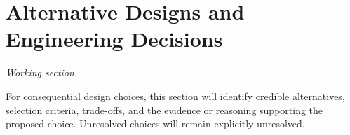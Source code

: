 \section{Alternative Designs and Engineering Decisions}
\label{sec:alternatives}

\textit{Working section.}

For consequential design choices, this section will identify credible alternatives,
selection criteria, trade-offs, and the evidence or reasoning supporting the proposed
choice. Unresolved choices will remain explicitly unresolved.
